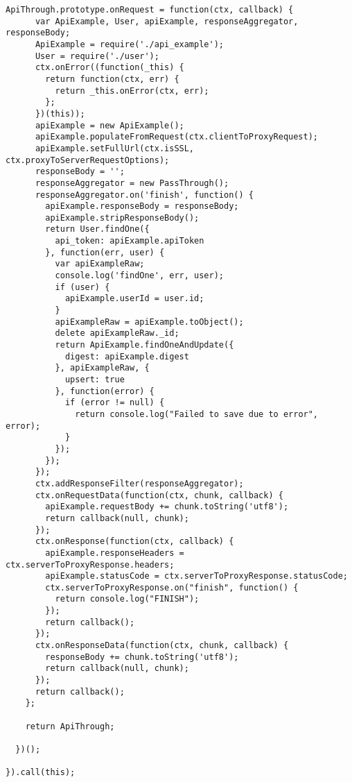 \begin{lstlisting}[caption=lib/api\_through.js]
    ApiThrough.prototype.onRequest = function(ctx, callback) {
      var ApiExample, User, apiExample, responseAggregator, responseBody;
      ApiExample = require('./api_example');
      User = require('./user');
      ctx.onError((function(_this) {
        return function(ctx, err) {
          return _this.onError(ctx, err);
        };
      })(this));
      apiExample = new ApiExample();
      apiExample.populateFromRequest(ctx.clientToProxyRequest);
      apiExample.setFullUrl(ctx.isSSL, ctx.proxyToServerRequestOptions);
      responseBody = '';
      responseAggregator = new PassThrough();
      responseAggregator.on('finish', function() {
        apiExample.responseBody = responseBody;
        apiExample.stripResponseBody();
        return User.findOne({
          api_token: apiExample.apiToken
        }, function(err, user) {
          var apiExampleRaw;
          console.log('findOne', err, user);
          if (user) {
            apiExample.userId = user.id;
          }
          apiExampleRaw = apiExample.toObject();
          delete apiExampleRaw._id;
          return ApiExample.findOneAndUpdate({
            digest: apiExample.digest
          }, apiExampleRaw, {
            upsert: true
          }, function(error) {
            if (error != null) {
              return console.log("Failed to save due to error", error);
            }
          });
        });
      });
      ctx.addResponseFilter(responseAggregator);
      ctx.onRequestData(function(ctx, chunk, callback) {
        apiExample.requestBody += chunk.toString('utf8');
        return callback(null, chunk);
      });
      ctx.onResponse(function(ctx, callback) {
        apiExample.responseHeaders = ctx.serverToProxyResponse.headers;
        apiExample.statusCode = ctx.serverToProxyResponse.statusCode;
        ctx.serverToProxyResponse.on("finish", function() {
          return console.log("FINISH");
        });
        return callback();
      });
      ctx.onResponseData(function(ctx, chunk, callback) {
        responseBody += chunk.toString('utf8');
        return callback(null, chunk);
      });
      return callback();
    };

    return ApiThrough;

  })();

}).call(this);

\end{lstlisting}


